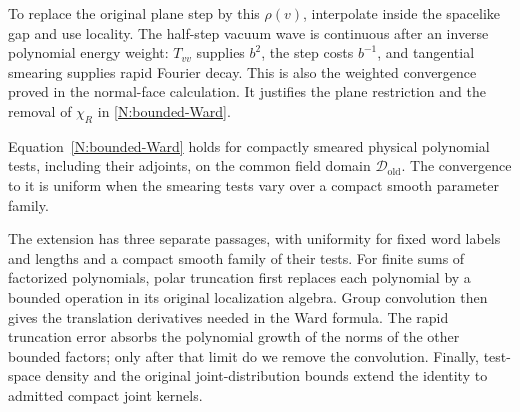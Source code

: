 To replace the original plane step by this $\rho(v)$, interpolate
inside the spacelike gap and use locality.  The half-step vacuum
wave is continuous after an inverse polynomial energy weight:
$T_{vv}$ supplies $b^2$, the step costs $b^{-1}$, and tangential
smearing supplies rapid Fourier decay.  This is also the weighted
convergence proved in the normal-face calculation.  It justifies
the plane restriction and the removal of $\chi_R$ in
\eqref{N:bounded-Ward}.

\begin{proposition}\label{N:polynomial-extension}
Equation~\eqref{N:bounded-Ward} holds for compactly smeared physical
polynomial tests, including their adjoints, on the common field
domain $\mathcal D_{\mathrm{old}}$.  The convergence to it is uniform when the smearing tests
vary over a compact smooth parameter family.
\end{proposition}

The extension has three separate passages, with uniformity for fixed word
labels and lengths and a compact smooth family of their tests. For finite sums of factorized
polynomials, polar truncation first replaces each polynomial by a bounded
operation in its original localization algebra. Group convolution then
gives the translation derivatives needed in the Ward formula. The rapid
truncation error absorbs the polynomial growth of the norms of the other
bounded factors; only after that limit do we remove the convolution.
Finally, test-space density and the original joint-distribution bounds
extend the identity to admitted compact joint kernels.

